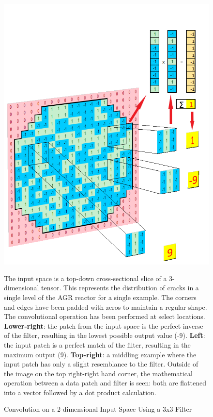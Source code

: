 \begin{figure}[p]
	\centering
	\includegraphics[scale=0.8]{Figures/convo_proj2.png}
	\caption{Convolution on a 2-dimensional Input Space Using a 3x3 Filter} {The input space is a top-down cross-sectional slice of a 3-dimensional tensor. This represents the distribution of cracks in a single level of the AGR reactor for a single example. The corners and edges have been padded with zeros to maintain a regular shape. The convolutional operation has been performed at select locations. \textbf{Lower-right}: the patch from the input space is the perfect inverse of the filter, resulting in the lowest possible output value (-9). \textbf{Left}: the input patch is a perfect match of the filter, resulting in the maximum output (9). \textbf{Top-right}: a middling example where the input patch has only a slight resemblance to the filter. Outside of the image on the top right-right hand corner, the mathematical operation between a data patch and filter is seen: both are flattened into a vector followed by a dot product calculation. }
	\label{fig:convo_operation}
\end{figure} 


